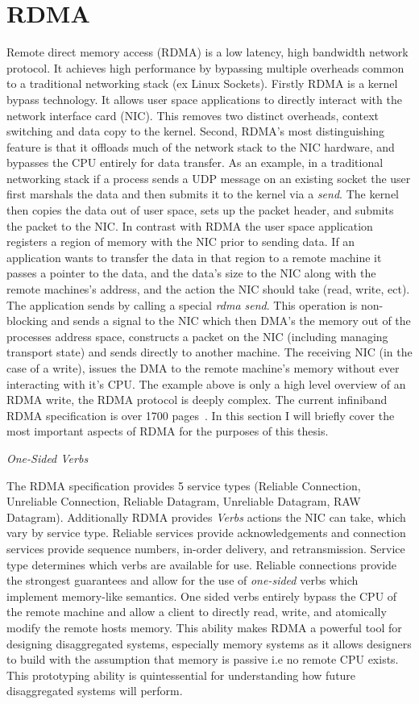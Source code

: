\documentclass[12pt]{ucsddissertation}
\begin{document}
\section{RDMA}

Remote direct memory access (RDMA) is a low latency, high bandwidth network protocol. It achieves
high performance by bypassing multiple overheads common to a traditional networking stack (ex Linux
Sockets). Firstly RDMA is a kernel bypass technology. It allows user space applications to directly
interact with the network interface card (NIC). This removes two distinct overheads, context
switching and data copy to the kernel. Second, RDMA's most distinguishing feature is that it
offloads much of the network stack to the NIC hardware, and bypasses the CPU entirely for data
transfer. As an example, in a traditional networking stack if a process sends a UDP message on an
existing socket the user first marshals the data and then submits it to the kernel via a
\textit{send}. The kernel then copies the data out of user space, sets up the packet header, and
submits the packet to the NIC. In contrast with RDMA the user space application registers a region
of memory with the NIC prior to sending data. If an application wants to transfer the data in that
region to a remote machine it passes a pointer to the data, and the data's size to the NIC along
with the remote machines's address, and the action the NIC should take (read, write, ect). The
application sends by calling a special \textit{rdma send}. This operation is non-blocking and sends
a signal to the NIC which then DMA's the memory out of the processes address space, constructs a
packet on the NIC (including managing transport state) and sends directly to another machine. The
receiving NIC (in the case of a write), issues the DMA to the remote machine's memory without ever
interacting with it's CPU.  The example above is only a high level overview of an RDMA write, the
RDMA protocol is deeply complex. The current infiniband RDMA specification is over 1700
pages~\cite{infiniband-spec}. In this section I will briefly cover the most important aspects of
RDMA for the purposes of this thesis.

\textit{One-Sided Verbs}

The RDMA specification provides 5 service types (Reliable Connection, Unreliable Connection,
Reliable Datagram, Unreliable Datagram, RAW Datagram). Additionally RDMA provides \textit{Verbs}
actions the NIC can take, which vary by service type. Reliable services provide acknowledgements and
connection services provide sequence numbers, in-order delivery, and retransmission. Service type
determines which verbs are available for use. Reliable connections provide the strongest guarantees
and allow for the use of \textit{one-sided} verbs which implement memory-like semantics. One sided
verbs entirely bypass the CPU of the remote machine and allow a client to directly read, write, and
atomically modify the remote hosts memory. This ability makes RDMA a powerful tool for designing
disaggregated systems, especially memory systems as it allows designers to build with the assumption
that memory is passive i.e no remote CPU exists. This prototyping ability is quintessential for
understanding how future disaggregated systems will perform.
\end{document}
